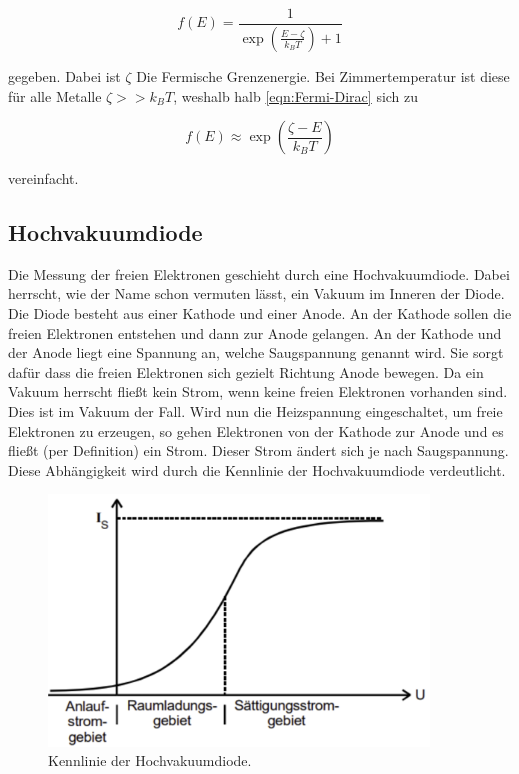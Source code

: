 \begin{equation}
    f(E)=\frac{1}{\exp{(\frac{E-\zeta}{k_B T})} + 1}
    \label{eqn:Fermi-Dirac}
\end{equation}

\noindent gegeben. Dabei ist $\zeta$ Die Fermische Grenzenergie. Bei Zimmertemperatur ist diese für alle Metalle 
$\zeta >>k_B T$, weshalb halb \autoref{eqn:Fermi-Dirac} sich zu 

\begin{equation*}
    f(E) \approx \exp{(\frac{\zeta - E}{k_B T})}
\end{equation*}

\noindent vereinfacht.


\subsection{Hochvakuumdiode}
Die Messung der freien Elektronen geschieht durch eine Hochvakuumdiode. Dabei herrscht, wie der Name schon vermuten 
lässt, ein Vakuum im Inneren der Diode. Die Diode besteht aus einer Kathode und einer Anode. An der Kathode sollen 
die freien Elektronen entstehen und dann zur Anode gelangen. An der Kathode und der Anode liegt eine Spannung an, 
welche Saugspannung genannt wird. Sie sorgt dafür dass die freien Elektronen sich gezielt Richtung Anode bewegen. 
Da ein Vakuum herrscht fließt kein Strom, wenn keine freien Elektronen vorhanden sind. Dies ist im Vakuum der Fall. 
Wird nun die Heizspannung eingeschaltet, um freie Elektronen zu erzeugen, so gehen Elektronen von der Kathode zur 
Anode und es fließt (per Definition) ein Strom. Dieser Strom ändert sich je nach Saugspannung. Diese Abhängigkeit 
wird durch die Kennlinie der Hochvakuumdiode verdeutlicht. 

\begin{figure}
    \centering
    \includegraphics[width=0.9\textwidth]{Kennlinie.png}
    \caption{Kennlinie der Hochvakuumdiode.}
\end{figure}

